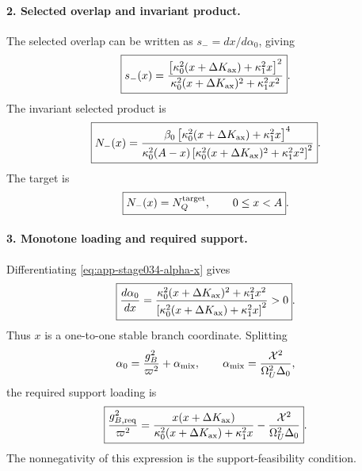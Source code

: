 \paragraph{2. Selected overlap and invariant product.}
The selected overlap can be written as \(s_-=dx/d\alpha_0\), giving
\begin{equation}
\label{eq:app-stage034-s-x}
\boxed{
s_-(x)=
\frac{\left[\kappa_0^2(x+\Delta K_{\rm ax})+\kappa_1^2x\right]^2}
{\kappa_0^2(x+\Delta K_{\rm ax})^2+\kappa_1^2x^2}}.
\end{equation}
The invariant selected product is
\begin{equation}
\label{eq:app-stage034-N-x}
\boxed{
N_-(x)=
\frac{\beta_0\left[\kappa_0^2(x+\Delta K_{\rm ax})+\kappa_1^2x\right]^4}
{\kappa_0^2(A-x)\left[\kappa_0^2(x+\Delta K_{\rm ax})^2+\kappa_1^2x^2\right]^2}}.
\end{equation}
The target is
\begin{equation}
\label{eq:app-stage034-N-target}
\boxed{
N_-(x)=N_Q^{\rm target},
\qquad
0\leq x<A}.
\end{equation}

\paragraph{3. Monotone loading and required support.}
Differentiating \eqref{eq:app-stage034-alpha-x} gives
\begin{equation}
\label{eq:app-stage034-dalpha-dx}
\boxed{
\frac{d\alpha_0}{dx}=
\frac{\kappa_0^2(x+\Delta K_{\rm ax})^2+\kappa_1^2x^2}
{\left[\kappa_0^2(x+\Delta K_{\rm ax})+\kappa_1^2x\right]^2}>0}.
\end{equation}
Thus \(x\) is a one-to-one stable branch coordinate.  Splitting
\begin{equation}
\alpha_0=\frac{g_B^2}{\varpi^2}+\alpha_{\rm mix},
\qquad
\alpha_{\rm mix}=\frac{\mathcal X^2}{\Omega_U^2\Delta_0},
\end{equation}
the required support loading is
\begin{equation}
\label{eq:app-stage034-support-req}
\boxed{
\frac{g_{B,{\rm req}}^2}{\varpi^2}
=
\frac{x(x+\Delta K_{\rm ax})}{\kappa_0^2(x+\Delta K_{\rm ax})+\kappa_1^2x}
-
\frac{\mathcal X^2}{\Omega_U^2\Delta_0}}.
\end{equation}
The nonnegativity of this expression is the support-feasibility condition.


